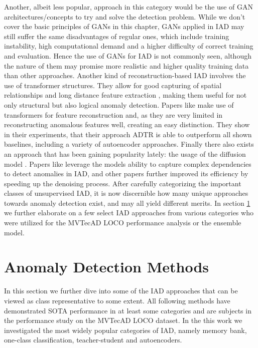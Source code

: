 Another, albeit less popular, approach in this category would be the use of GAN architectures/concepts to try and solve the detection problem. While we don't cover the basic principles of GANs in 
this chapter, GANs applied in IAD may still suffer the same disadvantages of regular ones, which include training instability, high computational demand and a higher difficulty of correct training and 
evaluation. Hence the use of GANs for IAD is not commonly seen, although the nature of them may promise more realistic and higher quality training data than other approaches.
Another kind of reconstruction-based IAD involves the use of transformer structures. They allow for good capturing of spatial relationships and long distance feature extraction \cite{xie2020benchmarking},
making them useful for not only structural but also logical anomaly detection. Papers like \cite{You_2023transformer} make use of transformers for feature reconstruction and, as they are very 
limited in reconstructing anomalous features well, creating an easy distinction. They show in their experiments, that their approach ADTR is able to outperform all shown baselines, including 
a variety of autoencoder approaches.
Finally there also exists an approach that has been gaining popularity lately: the usage of the diffusion model \cite{ho2020denoisingdiffusionOG}. Papers like \cite{Wyatt_2022diffusionfirstapproach} 
leverage the models ability to capture complex dependencies to detect anomalies in IAD, and other papers \cite{zhang2023diffusionaddiffusionmodern} further improved its efficiency by speeding up 
the denoising process.
\newline
After carefully categorizing the important classes of unsupervised IAD, it is now discernible how many unique approaches towards anomaly detection exist, and may all yield different merits. 
In section \ref{sec:IADmethods} we further elaborate on a few select IAD approaches from various categories who were utilized for the MVTecAD LOCO performance analysis or the ensemble 
model. 


\section{Anomaly Detection Methods}
\label{sec:IADmethods}
In this section we further dive into some of the IAD approaches that can be viewed as class representative to some extent. All following methods have demonstrated SOTA performance in 
at least some categories and are subjects in the performance study on the MVTecAD LOCO dataset. In the this work we investigated the most widely popular categories of 
IAD, namely memory bank, one-class classification, teacher-student and autoencoders.%


